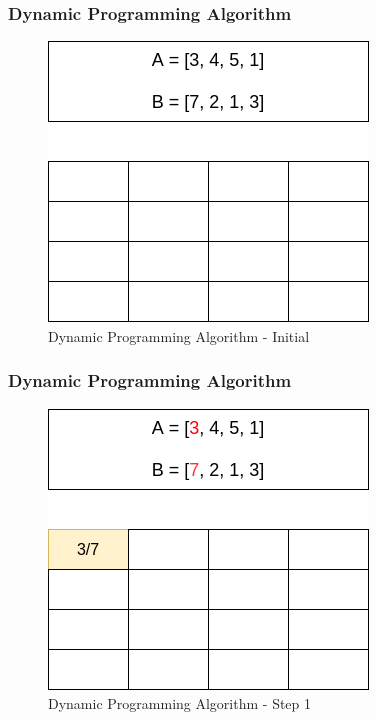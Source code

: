 \documentclass{beamer}
\begin{document}
    \begin{frame}
      \frametitle{Dynamic Programming Algorithm}
      
      \begin{figure}
		\centering
		\includegraphics[scale=.48]{dp_0.png}
		\caption{Dynamic Programming Algorithm - Initial}
		\label{fig:dynamic_programming_algorithm_0}
	  \end{figure}
      
    \end{frame}
    
    \begin{frame}
      \frametitle{Dynamic Programming Algorithm}
      
      \begin{figure}
		\centering
		\includegraphics[scale=.48]{dp_1.png}
		\caption{Dynamic Programming Algorithm - Step 1}
		\label{fig:dynamic_programming_algorithm_1}
	  \end{figure}
      
    \end{frame}
    
\end{document}
